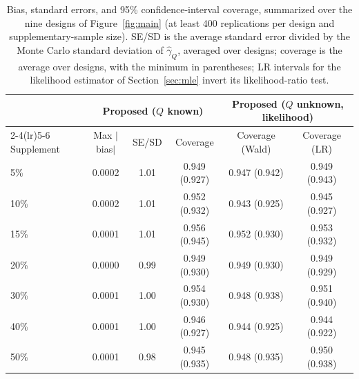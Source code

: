 \begin{table}[t]
\centering
\caption{Bias, standard errors, and 95\% confidence-interval coverage, summarized over the nine designs of Figure~\ref{fig:main} (at least 400 replications per design and supplementary-sample size). SE/SD is the average standard error divided by the Monte Carlo standard deviation of $\hat\gamma_Q$, averaged over designs; coverage is the average over designs, with the minimum in parentheses; LR intervals for the likelihood estimator of Section~\ref{sec:mle} invert its likelihood-ratio test.}
\label{tab:coverage}
\begin{tabular}{lccccc}
\toprule
& \multicolumn{3}{c}{Proposed ($Q$ known)} & \multicolumn{2}{c}{Proposed ($Q$ unknown, likelihood)} \\ \cmidrule(lr){2-4}\cmidrule(lr){5-6}
Supplement & Max $|$bias$|$ & SE/SD & Coverage & Coverage (Wald) & Coverage (LR) \\
\midrule
5\% & 0.0002 & 1.01 & 0.949 (0.927) & 0.947 (0.942) & 0.949 (0.943) \\
10\% & 0.0002 & 1.01 & 0.952 (0.932) & 0.943 (0.925) & 0.945 (0.927) \\
15\% & 0.0001 & 1.01 & 0.956 (0.945) & 0.952 (0.930) & 0.953 (0.932) \\
20\% & 0.0000 & 0.99 & 0.949 (0.930) & 0.949 (0.930) & 0.949 (0.929) \\
30\% & 0.0001 & 1.00 & 0.954 (0.930) & 0.948 (0.938) & 0.951 (0.940) \\
40\% & 0.0001 & 1.00 & 0.946 (0.927) & 0.944 (0.925) & 0.944 (0.922) \\
50\% & 0.0001 & 0.98 & 0.945 (0.935) & 0.948 (0.935) & 0.950 (0.938) \\
\bottomrule
\end{tabular}
\end{table}
